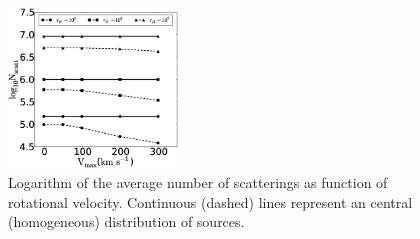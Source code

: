 \documentclass{emulateapj}
\begin{document}
\begin{figure}
\begin{center}
    \includegraphics[width=0.40\textwidth]{f4.eps}
\end{center}
\caption{Logarithm of the average number of scatterings as function of
  rotational velocity. Continuous (dashed) lines represent an
  central (homogeneous) distribution of sources. \label{fig:Nscatt}}    
\end{figure}
\end{document}
